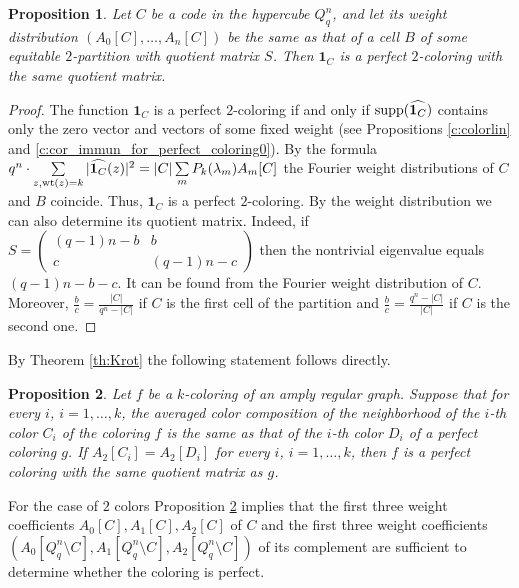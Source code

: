 \documentclass[11pt]{article}
\newtheorem{claim}{Proposition}[section]
\theoremstyle{definition}
\newcommand{\supp}{{\rm supp}}
\newcommand{\wt}{{\rm wt}}
\begin{document}
{{{\begin{claim}
Let $C$ be a code in the hypercube $Q^n_q$, and let its weight distribution $(A_0[C],\dots,A_n[C])$ be the same as that of a cell $B$ of some equitable $2$-partition with quotient matrix $S$. Then ${\mathbf 1}_{C}$ is a perfect $2$-coloring with the same quotient matrix.
\end{claim}
\begin{proof}
The function ${\mathbf 1}_{C}$ is a perfect $2$-coloring if and only if $\supp( \widehat{{\mathbf 1}_{C}})$ contains only the zero vector and vectors of some fixed weight (see Propositions \ref{c:colorlin} and \ref{c:cor_immun_for_perfect_coloring0}). By the formula $q^n\cdot\sum\limits_{z,\wt(z)=k}|\widehat{{\mathbf 1}_{C}}(z)|^2=|C|\sum\limits_m P_k(\lambda_m)A_m[C]$ the Fourier weight distributions of $C$ and $B$ coincide. Thus, ${\mathbf 1}_{C}$ is a perfect $2$-coloring.  By the weight distribution  we can also determine its quotient matrix. Indeed, if $S=\begin{pmatrix}
    (q-1)n-b & b\\
    c & (q-1)n-c
    \end{pmatrix}$ then the nontrivial eigenvalue  equals $(q-1)n-b -c$.  It can be found from the Fourier weight distribution of $C$. Moreover, $\frac{b}{c}= \frac{|C|}{q^n-|C|}$ if $C$ is the first cell of the partition and 
    $\frac{b}{c}= \frac{q^n-|C|}{|C|}$ if $C$ is the second one.
\end{proof}

By Theorem \ref{th:Krot} the following statement follows directly.

\begin{claim}\label{cl:color_comp}
Let $f$ be a $k$-coloring of an amply regular graph. Suppose that for every $i$, $i=1,\dots,k$, the averaged color composition of the neighborhood of the $i$-th color $C_i$ of the coloring $f$ is the same as that of the $i$-th color $D_i$ of a perfect coloring $g$. If $A_2[C_i]=A_2[D_i]$ for every $i$, $i=1,\dots,k$, then $f$ is a perfect coloring with the same quotient matrix as $g$.
\end{claim}

For the case of $2$ colors Proposition \ref{cl:color_comp} implies that the first three weight
 coefficients  $A_0[C], A_1[C] ,A_2[C]$ of $C$ and   the first   three weight
 coefficients $(A_0[Q^n_q\setminus C],  A_1[Q^n_q\setminus C], A_2[Q^n_q\setminus C])$  of its complement are sufficient to determine whether the coloring is perfect.

}}}
\end{document}
